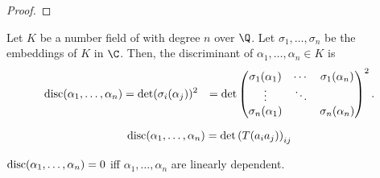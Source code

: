 \begin{proof}
\end{proof}

\begin{definition}[Discriminant]
	Let $K$ be a number field of with degree $n$ over $\Q$. Let $\sigma_1, \ldots, \sigma_n$ be the embeddings of $K$ in $\C$. Then, the discriminant of $\alpha_1, \ldots, \alpha_n \in K$ is
	\begin{equation}
		\begin{aligned}
			\operatorname{disc}(\alpha_1, \ldots, \alpha_n)
			 & = \det(\sigma_i(\alpha_j))^2
			 & = \det \begin{pmatrix}
				          \sigma_1(\alpha_1) & \cdots & \sigma_1(\alpha_n) \\
				          \vdots             & \ddots &                    \\
				          \sigma_n(\alpha_1) &        & \sigma_n(\alpha_n)
			          \end{pmatrix}^2.
		\end{aligned}
	\end{equation}
\end{definition}

\begin{theorem}
	\begin{equation}
		\operatorname{disc}(\alpha_1, \ldots, \alpha_n) = \det \left(T(a_i a_j)\right)_{ij}
	\end{equation}
\end{theorem}

\begin{theorem}
	$\operatorname{disc}(\alpha_1, \ldots, \alpha_n) = 0$ iff $\alpha_1, \ldots, \alpha_n$ are linearly dependent.
\end{theorem}

